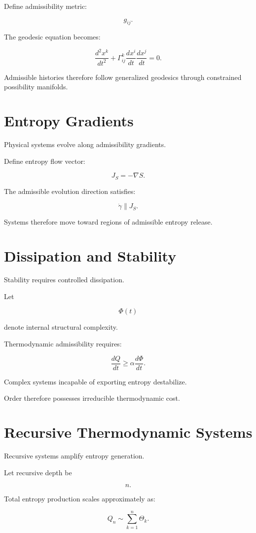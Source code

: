 \documentclass[12pt,openany]{book}
\theoremstyle{plain}
\theoremstyle{definition}
\theoremstyle{remark}
\begin{document}
Define admissibility metric:

\[
g_{ij}.
\]

The geodesic equation becomes:

\[
\frac{d^2x^k}{dt^2}
+
\Gamma^k_{ij}
\frac{dx^i}{dt}
\frac{dx^j}{dt}
=
0.
\]

Admissible histories therefore follow generalized geodesics
through constrained possibility manifolds.

\section{Entropy Gradients}

Physical systems evolve along admissibility gradients.

Define entropy flow vector:

\[
J_S
=
-\nabla S.
\]

The admissible evolution direction satisfies:

\[
\dot\gamma
\parallel
J_S.
\]

Systems therefore move toward regions of admissible entropy
release.

\section{Dissipation and Stability}

Stability requires controlled dissipation.

Let

\[
\Phi(t)
\]

denote internal structural complexity.

Thermodynamic admissibility requires:

\[
\frac{dQ}{dt}
\geq
\alpha
\frac{d\Phi}{dt}.
\]

Complex systems incapable of exporting entropy destabilize.

Order therefore possesses irreducible thermodynamic cost.

\section{Recursive Thermodynamic Systems}

Recursive systems amplify entropy generation.

Let recursive depth be

\[
n.
\]

Total entropy production scales approximately as:

\[
Q_n
\sim
\sum_{k=1}^{n}
\Theta_k.
\]
\end{document}
